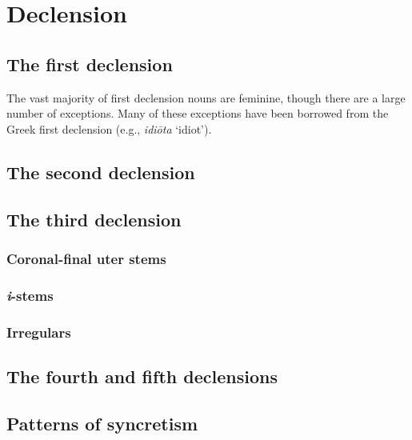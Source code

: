 \chapter{Declension}

\section{The first declension}

The vast majority of first declension nouns are feminine, though there are a large number of exceptions. Many of these exceptions have been borrowed from the Greek first declension (e.g., \emph{idiōta} `idiot'). 



\section{The second declension}


\section{The third declension}

\subsection{Coronal-final uter stems}

\subsection{\emph{i}-stems}

\subsection{Irregulars}

\section{The fourth and fifth declensions}

\section{Patterns of syncretism}
